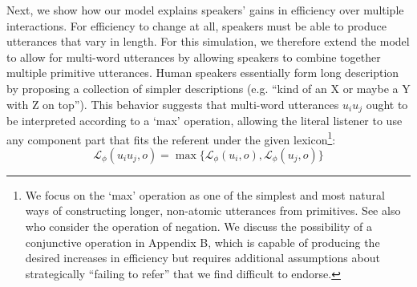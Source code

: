 Next, we show how our model explains speakers' gains in efficiency over multiple interactions. 
For efficiency to change at all, speakers must be able to produce utterances that vary in length. 
For this simulation, we therefore extend the model to allow for multi-word utterances by allowing speakers to combine together multiple primitive utterances.
Human speakers essentially form long description by proposing a collection of simpler descriptions (e.g. ``kind of an X or maybe a Y with Z on top''). 
This behavior suggests that multi-word utterances $u_iu_j$ ought to be interpreted according to a `max' operation, allowing the literal listener to use any component part that fits the referent under the given lexicon\footnote{We focus on the `max' operation as one of the simplest and most natural ways of constructing longer, non-atomic utterances from primitives. See also  who consider the operation of negation. We discuss the possibility of a conjunctive operation in Appendix B, which is capable of producing the desired increases in efficiency but requires additional assumptions about strategically ``failing to refer'' that we find difficult to endorse.}:
$$\mathcal{L}_\phi(u_iu_j, o) = \max\{\mathcal{L}_\phi(u_i, o) , \mathcal{L}_\phi(u_j, o)\}$$
